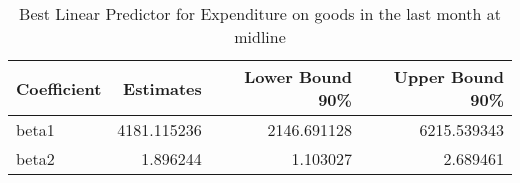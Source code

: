 \begin{table}

\caption{\label{tab:blpRExpenditure_totDF}Best Linear Predictor for Expenditure on goods in the last month at midline}
\centering
\begin{tabular}[t]{lrrr}
\toprule
Coefficient & Estimates & Lower Bound 90\% & Upper Bound 90\%\\
\midrule
beta1 & 4181.115236 & 2146.691128 & 6215.539343\\
beta2 & 1.896244 & 1.103027 & 2.689461\\
\bottomrule
\end{tabular}
\end{table}
